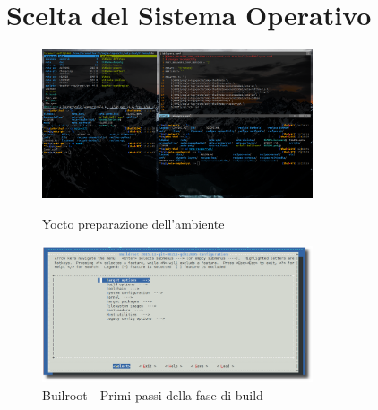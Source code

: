 \newpage


\section{Scelta del Sistema Operativo}

\begin{figure}[h!]
    \centering
    \begin{minipage}{0.5\textwidth}
        \centering
        \includegraphics[width=8cm]{./figures/yoctoWorkFlow.png} %
        \caption{Yocto preparazione dell'ambiente}    
    \end{minipage}\hfill
    \begin{minipage}{0.5\textwidth}
        \centering
        \includegraphics[width=8cm]{./figures/menuBuildRoot.png} %
        \caption{Builroot - Primi passi della fase di build}        
    \end{minipage}
\end{figure}


